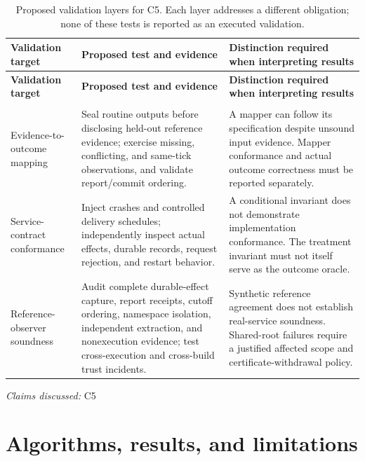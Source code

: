 \documentclass[11pt]{article}
\begin{document}
\begin{longtable}{@{}>{\raggedright\arraybackslash}p{}>{\raggedright\arraybackslash}p{}>{\raggedright\arraybackslash}p{}@{}}
\caption{Proposed validation layers for C5. Each layer addresses a different obligation; none of these tests is reported as an executed validation.}\\
\toprule
\textbf{Validation target} & \textbf{Proposed test and evidence} & \textbf{Distinction required when interpreting results}\\
\midrule
\endfirsthead
\toprule
\textbf{Validation target} & \textbf{Proposed test and evidence} & \textbf{Distinction required when interpreting results}\\
\midrule
\endhead
\midrule
\multicolumn{3}{r}{\footnotesize Continued on next page}\\
\endfoot
\bottomrule
\endlastfoot
Evidence-to-outcome mapping & Seal routine outputs before disclosing held-out reference evidence; exercise missing, conflicting, and same-tick observations, and validate report/commit ordering. & A mapper can follow its specification despite unsound input evidence. Mapper conformance and actual outcome correctness must be reported separately.\\
Service-contract conformance & Inject crashes and controlled delivery schedules; independently inspect actual effects, durable records, request rejection, and restart behavior. & A conditional invariant does not demonstrate implementation conformance. The treatment invariant must not itself serve as the outcome oracle.\\
Reference-observer soundness & Audit complete durable-effect capture, report receipts, cutoff ordering, namespace isolation, independent extraction, and nonexecution evidence; test cross-execution and cross-build trust incidents. & Synthetic reference agreement does not establish real-service soundness. Shared-root failures require a justified affected scope and certificate-withdrawal policy.\\
\end{longtable}
\par{}
\textit{Claims discussed: }C5
\section{Algorithms, results, and limitations}
\end{document}

